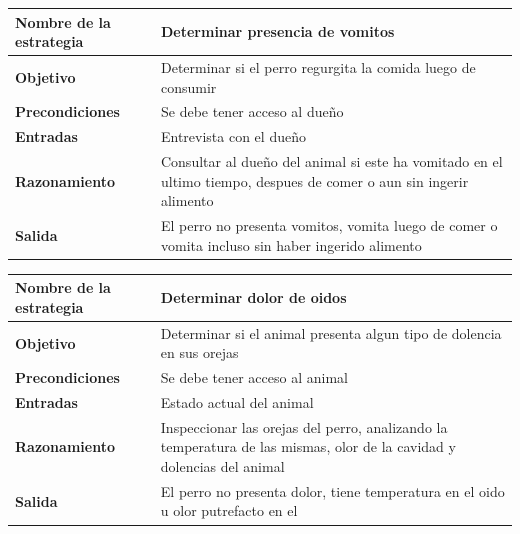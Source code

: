 \documentclass[a4paper,table,xcdraw]{article}
\begin{document}
\begin{longtable}{|m{100pt}|m{300pt}|}
\hline
\textbf{Nombre de la estrategia} & Determinar presencia de vomitos                                                                                    \\ \hline
\endhead
%
\textbf{Objetivo}                & Determinar si el perro regurgita la comida luego de consumir                                                       \\ \hline
\textbf{Precondiciones}          & Se debe tener acceso al dueño                                                                                      \\ \hline
\textbf{Entradas}                & Entrevista con el dueño                                                                                            \\ \hline
\textbf{Razonamiento}            & Consultar al dueño del animal si este ha vomitado en el ultimo tiempo, despues de comer o aun sin ingerir alimento \\ \hline
\textbf{Salida}                  & El perro no presenta vomitos, vomita luego de comer o vomita incluso sin haber ingerido alimento                   \\ \hline
\end{longtable}

\begin{longtable}{|m{100pt}|m{300pt}|}
\hline
\textbf{Nombre de la estrategia} & Determinar dolor de oidos                                                                                             \\ \hline
\endhead
%
\textbf{Objetivo}                & Determinar si el animal presenta algun tipo de dolencia en sus orejas                                                 \\ \hline
\textbf{Precondiciones}          & Se debe tener acceso al animal                                                                                        \\ \hline
\textbf{Entradas}                & Estado actual del animal                                                                                              \\ \hline
\textbf{Razonamiento}            & Inspeccionar las orejas del perro, analizando la temperatura de las mismas, olor de la cavidad y dolencias del animal \\ \hline
\textbf{Salida}                  & El perro no presenta dolor, tiene temperatura en el oido u olor putrefacto en el                                      \\ \hline
\end{longtable}
\end{document}
